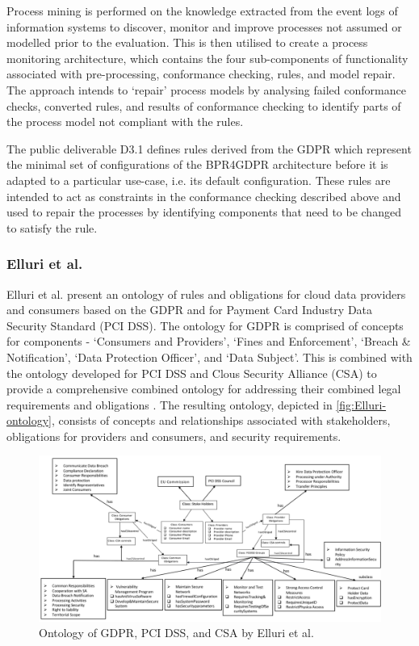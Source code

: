 Process mining is performed on the knowledge extracted from the event logs of information systems to discover, monitor and improve processes not assumed or modelled prior to the evaluation. This is then utilised to create a process monitoring architecture, which contains the four sub-components of functionality
associated with pre-processing, conformance checking, rules, and model repair.
The approach intends to `repair' process models by analysing failed conformance checks, converted rules, and results of conformance checking to identify parts of the process model not compliant with the rules. 

The public deliverable D3.1 \cite{lioudakis_d3.1_2019} defines rules derived from the GDPR which represent the minimal set of configurations of the BPR4GDPR architecture before it is adapted to a particular use-case, i.e. its default configuration. These rules are intended to act as constraints in the conformance checking described above and used to repair the processes by identifying components that need to be changed to satisfy the rule.

\subsubsection{Elluri et al.}\label{sec:sota:Elluri}
Elluri et al. \cite{elluri_knowledge_2018, elluri_integrated_2018} present an ontology of rules and obligations for cloud data providers and consumers based on the GDPR and for Payment Card Industry Data Security Standard (PCI DSS). The ontology for GDPR \cite{elluri_knowledge_2018} is comprised of concepts for components - `Consumers and Providers', `Fines and Enforcement', `Breach \& Notification', `Data Protection Officer', and `Data Subject'. This is combined with the ontology developed for PCI DSS and Clous Security Alliance (CSA) to provide a comprehensive combined ontology for addressing their combined legal requirements and obligations \cite{elluri_integrated_2018}. The resulting ontology, depicted in \autoref{fig:Elluri-ontology}, consists of concepts and relationships associated with stakeholders, obligations for providers and consumers, and security requirements. 
\begin{figure}[htbp]
    \centering
    \includegraphics[width=\linewidth]{img/Elluri_ontology.png}
    \caption{Ontology of GDPR, PCI DSS, and CSA by Elluri et al. \cite{elluri_integrated_2018}}
    \label{fig:Elluri-ontology}
\end{figure}

